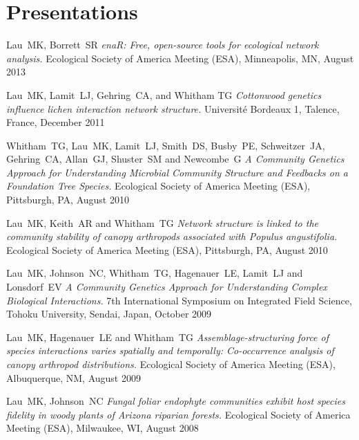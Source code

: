 \documentclass[letterpaper]{article}
\renewenvironment{itemize}{
  \begin{list}{}{
    \setlength{\leftmargin}{1em}
  }
}{
  \end{list}
}
\begin{document}
\section{Presentations}

\begin{itemize}

\item Lau\ MK, Borrett\ SR \textit{enaR: Free, open-source tools for
  ecological network analysis.} Ecological Society of America Meeting
  (ESA), Minneapolis, MN, August 2013

\item Lau\ MK, Lamit\ LJ, Gehring\ CA, and Whitham TG
  \textit{Cottonwood genetics influence lichen interaction network
    structure.} Universit\'{e} Bordeaux 1, Talence, France, December 2011

\item Whitham\ TG, Lau\ MK, Lamit\ LJ, Smith\ DS, Busby\ PE, Schweitzer\ JA, Gehring\ CA, Allan\ GJ, Shuster\ SM and Newcombe\ G \textit{ A Community Genetics Approach for Understanding Microbial Community Structure and Feedbacks on a Foundation Tree Species.} Ecological Society of America Meeting (ESA), Pittsburgh, PA, August 2010

\item Lau\ MK, Keith\ AR and Whitham\ TG \textit{Network structure is linked to the community stability of canopy arthropods associated with Populus angustifolia.} Ecological Society of America Meeting (ESA), Pittsburgh, PA, August 2010

\item Lau\ MK, Johnson\ NC, Whitham\ TG, Hagenauer\ LE, Lamit\ LJ and Lonsdorf\ EV \textit{A Community Genetics Approach for Understanding Complex Biological Interactions.} 7th International Symposium on Integrated Field Science, Tohoku University, Sendai, Japan, October 2009

\item Lau\ MK, Hagenauer\ LE and Whitham\ TG \textit{Assemblage-structuring force of species interactions varies spatially and temporally: Co-occurrence analysis of canopy arthropod distributions.} Ecological Society of America Meeting (ESA), Albuquerque, NM, August 2009

\item Lau\ MK, Johnson\ NC \textit{Fungal foliar endophyte communities exhibit host species fidelity in woody plants of Arizona riparian forests.} Ecological Society of America Meeting (ESA), Milwaukee, WI, August 2008


\end{itemize}
\end{document}
